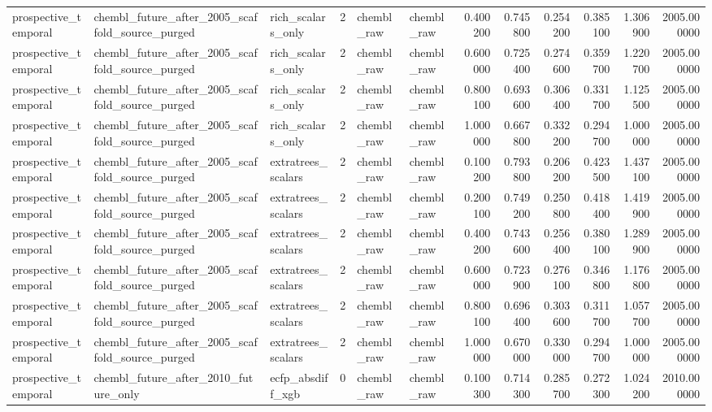 \begin{longtable}{lllrllrrrrrr}
prospective\_temporal & chembl\_future\_after\_2005\_scaffold\_source\_purged & rich\_scalars\_only & 2 & chembl\_raw & chembl\_raw & 0.400200 & 0.745800 & 0.254200 & 0.385100 & 1.306900 & 2005.000000 \\
prospective\_temporal & chembl\_future\_after\_2005\_scaffold\_source\_purged & rich\_scalars\_only & 2 & chembl\_raw & chembl\_raw & 0.600000 & 0.725400 & 0.274600 & 0.359700 & 1.220700 & 2005.000000 \\
prospective\_temporal & chembl\_future\_after\_2005\_scaffold\_source\_purged & rich\_scalars\_only & 2 & chembl\_raw & chembl\_raw & 0.800100 & 0.693600 & 0.306400 & 0.331700 & 1.125500 & 2005.000000 \\
prospective\_temporal & chembl\_future\_after\_2005\_scaffold\_source\_purged & rich\_scalars\_only & 2 & chembl\_raw & chembl\_raw & 1.000000 & 0.667800 & 0.332200 & 0.294700 & 1.000000 & 2005.000000 \\
prospective\_temporal & chembl\_future\_after\_2005\_scaffold\_source\_purged & extratrees\_scalars & 2 & chembl\_raw & chembl\_raw & 0.100200 & 0.793800 & 0.206200 & 0.423500 & 1.437100 & 2005.000000 \\
prospective\_temporal & chembl\_future\_after\_2005\_scaffold\_source\_purged & extratrees\_scalars & 2 & chembl\_raw & chembl\_raw & 0.200100 & 0.749200 & 0.250800 & 0.418400 & 1.419900 & 2005.000000 \\
prospective\_temporal & chembl\_future\_after\_2005\_scaffold\_source\_purged & extratrees\_scalars & 2 & chembl\_raw & chembl\_raw & 0.400200 & 0.743600 & 0.256400 & 0.380100 & 1.289900 & 2005.000000 \\
prospective\_temporal & chembl\_future\_after\_2005\_scaffold\_source\_purged & extratrees\_scalars & 2 & chembl\_raw & chembl\_raw & 0.600000 & 0.723900 & 0.276100 & 0.346800 & 1.176800 & 2005.000000 \\
prospective\_temporal & chembl\_future\_after\_2005\_scaffold\_source\_purged & extratrees\_scalars & 2 & chembl\_raw & chembl\_raw & 0.800100 & 0.696400 & 0.303600 & 0.311700 & 1.057700 & 2005.000000 \\
prospective\_temporal & chembl\_future\_after\_2005\_scaffold\_source\_purged & extratrees\_scalars & 2 & chembl\_raw & chembl\_raw & 1.000000 & 0.670000 & 0.330000 & 0.294700 & 1.000000 & 2005.000000 \\
prospective\_temporal & chembl\_future\_after\_2010\_future\_only & ecfp\_absdiff\_xgb & 0 & chembl\_raw & chembl\_raw & 0.100300 & 0.714300 & 0.285700 & 0.272300 & 1.024200 & 2010.000000 \\

\end{longtable}
